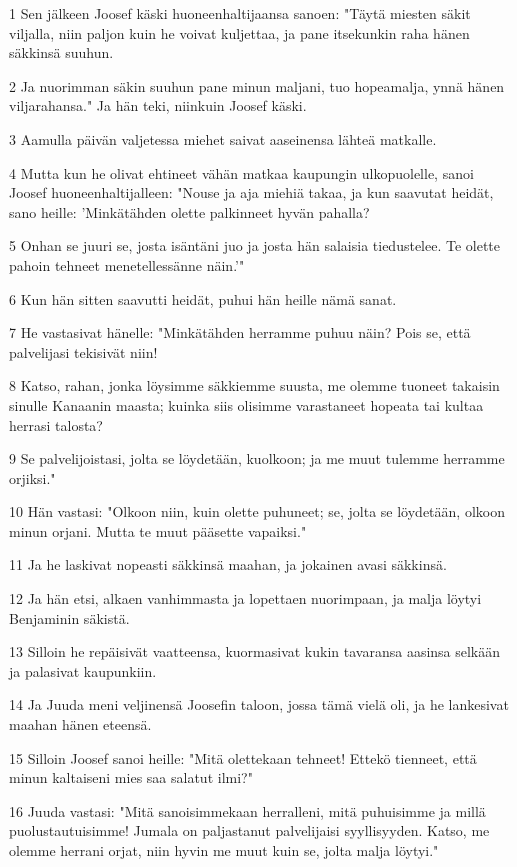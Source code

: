 \par 1 Sen jälkeen Joosef käski huoneenhaltijaansa sanoen: "Täytä miesten säkit viljalla, niin paljon kuin he voivat kuljettaa, ja pane itsekunkin raha hänen säkkinsä suuhun.
\par 2 Ja nuorimman säkin suuhun pane minun maljani, tuo hopeamalja, ynnä hänen viljarahansa." Ja hän teki, niinkuin Joosef käski.
\par 3 Aamulla päivän valjetessa miehet saivat aaseinensa lähteä matkalle.
\par 4 Mutta kun he olivat ehtineet vähän matkaa kaupungin ulkopuolelle, sanoi Joosef huoneenhaltijalleen: "Nouse ja aja miehiä takaa, ja kun saavutat heidät, sano heille: 'Minkätähden olette palkinneet hyvän pahalla?
\par 5 Onhan se juuri se, josta isäntäni juo ja josta hän salaisia tiedustelee. Te olette pahoin tehneet menetellessänne näin.'"
\par 6 Kun hän sitten saavutti heidät, puhui hän heille nämä sanat.
\par 7 He vastasivat hänelle: "Minkätähden herramme puhuu näin? Pois se, että palvelijasi tekisivät niin!
\par 8 Katso, rahan, jonka löysimme säkkiemme suusta, me olemme tuoneet takaisin sinulle Kanaanin maasta; kuinka siis olisimme varastaneet hopeata tai kultaa herrasi talosta?
\par 9 Se palvelijoistasi, jolta se löydetään, kuolkoon; ja me muut tulemme herramme orjiksi."
\par 10 Hän vastasi: "Olkoon niin, kuin olette puhuneet; se, jolta se löydetään, olkoon minun orjani. Mutta te muut pääsette vapaiksi."
\par 11 Ja he laskivat nopeasti säkkinsä maahan, ja jokainen avasi säkkinsä.
\par 12 Ja hän etsi, alkaen vanhimmasta ja lopettaen nuorimpaan, ja malja löytyi Benjaminin säkistä.
\par 13 Silloin he repäisivät vaatteensa, kuormasivat kukin tavaransa aasinsa selkään ja palasivat kaupunkiin.
\par 14 Ja Juuda meni veljinensä Joosefin taloon, jossa tämä vielä oli, ja he lankesivat maahan hänen eteensä.
\par 15 Silloin Joosef sanoi heille: "Mitä olettekaan tehneet! Ettekö tienneet, että minun kaltaiseni mies saa salatut ilmi?"
\par 16 Juuda vastasi: "Mitä sanoisimmekaan herralleni, mitä puhuisimme ja millä puolustautuisimme! Jumala on paljastanut palvelijaisi syyllisyyden. Katso, me olemme herrani orjat, niin hyvin me muut kuin se, jolta malja löytyi."
